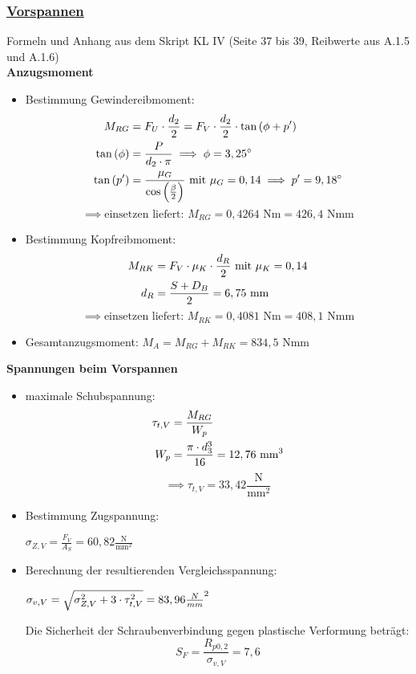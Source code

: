 \subsubsection{\underline{Vorspannen}}
Formeln und Anhang aus dem Skript KL IV  (Seite 37 bis 39, Reibwerte aus A.1.5 und A.1.6) \\
\textbf{Anzugsmoment}\\
\begin{itemize}
		\item Bestimmung Gewindereibmoment: 
		\begin{align*}
		M_{RG} &= F_U \cdot \frac{d_2}{2} = F_V\cdot \frac{d_2}{2}\cdot \tan\left(\phi + p'\right)\\
		\tan\left(\phi\right) &= \frac{P}{d_2 \cdot \pi}\implies \phi = 3,25^{\circ}\\
		\tan\left(p'\right) &= \frac{\mu_G}{\cos\left(\frac{\beta}{2}\right)} \text{ mit } \mu_G = 0,14 \implies p' = 9,18^{\circ}
		\end{align*}
		\[\implies \text{einsetzen liefert: }  M_{RG} =0,4264 \text{ Nm} = 426,4\text{ Nmm}\]
			
		\item Bestimmung Kopfreibmoment:
		\begin{align*}
		M_{RK}&= F_V\cdot \mu_K\cdot \frac{d_R}{2} \text{ mit }\mu_K = 0,14\\
		d_R &= \frac{S+D_B}{2} = 6,75 \text{ mm}
		\end{align*}
		\[\implies \text{einsetzen liefert: }  M_{RK} = 0,4081 \text{ Nm} = 408,1\text{ Nmm} \]
		
		\item Gesamtanzugsmoment:
	$M_A = M_{RG} + M_{RK} = 834,5 \text{ Nmm}$
\end{itemize}
\newpage
\textbf{Spannungen beim Vorspannen}
\begin{itemize}
	\item maximale Schubspannung:
	\begin{align*}
		\tau_{t,V} &= \frac{M_{RG}}{W_p}\\
		W_p &= \frac{\pi\cdot d_3^3}{16} = 12,76 \text{ mm}^3
	\end{align*}
	\[\implies \tau_{t,V} = 33,42 \frac{\text{N}}{\text{mm}^2}\]
	\item Bestimmung Zugspannung: \\
	\begin{center} $\sigma_{Z,V} = \frac{F_V}{A_S} = 60,82 \frac{\text{N}}{\text{mm}^2}$\end{center}
	\item Berechnung der resultierenden Vergleichsspannung:\\
	\begin{center}
		$\sigma_{v,V} = \sqrt{\sigma_{Z,V}^2+3\cdot\tau_{t,V}^2} = 83,96 \frac{N}{mm}^2$ \\
	\end{center} 
	Die Sicherheit der Schraubenverbindung gegen plastische Verformung beträgt:\\ 
	\[S_F = \frac{R_{p0,2}}{\sigma_{v,V}} = 7,6\]
\end{itemize}
\newpage
